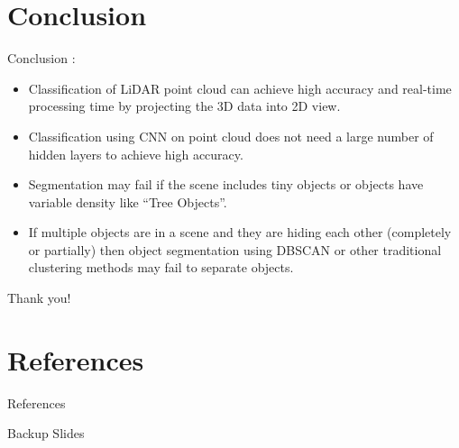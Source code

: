 \documentclass[9pt]{beamer}
\begin{document}

\section{Conclusion}
\begin{frame}[fragile]{Conclusion }
:
\begin{itemize}
	\item Classification of LiDAR point cloud can achieve high accuracy and real-time processing time by projecting the 3D data into 2D view.
	\item Classification using CNN on point cloud does not need a large number of hidden layers to achieve high accuracy.
	\item Segmentation may fail if the scene includes tiny objects or objects have variable density like ``Tree Objects''.
	\item If multiple objects are in a scene and they are hiding each other (completely or partially) then object segmentation using DBSCAN
	or other traditional clustering methods may fail to separate objects.
\end{itemize}
\end{frame}


\appendix
\begin{frame}[fragile]{}

\centering
\Huge
Thank you!

\end{frame}

\section{References}
\begin{frame}[allowframebreaks]{References}

	
	

\end{frame}



\appendix
\begin{frame}[fragile]{}

\centering
\Huge
Backup Slides

\end{frame}
\end{document}
